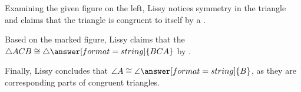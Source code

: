 \documentclass[nooutcomes]{ximera}
\begin{document}
\begin{problem}
Examining the given figure on the left, Lissy notices symmetry in the triangle and claims that the triangle is congruent to itself by a .  

Based on the marked figure, Lissy claims that the $\triangle ACB\cong \triangle\answer[format=string]{BCA}$ by . 

Finally, Lissy concludes that $\angle A\cong \angle\answer[format=string]{B}$, as they are corresponding parts of congruent triangles. 
 

\end{problem}
\end{document}
